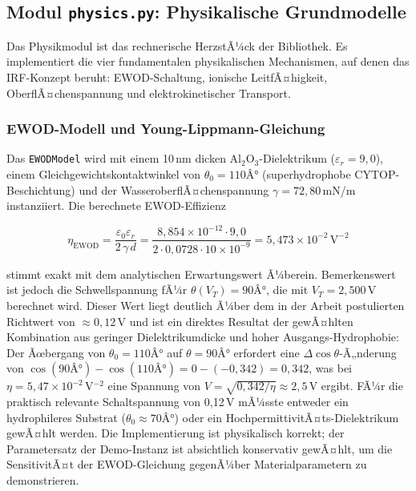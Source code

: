 ﻿\documentclass[a4paper,12pt]{scrreprt}
\theoremstyle{definition}
\begin{document}
\subsection{Modul \texttt{physics.py}: Physikalische Grundmodelle}
\label{subsec:demo_physics}

Das Physikmodul ist das rechnerische HerzstÃ¼ck der Bibliothek. Es implementiert
die vier fundamentalen physikalischen Mechanismen, auf denen das IRF-Konzept
beruht: EWOD-Schaltung, ionische LeitfÃ¤higkeit, OberflÃ¤chenspannung und
elektrokinetischer Transport.

\subsubsection{EWOD-Modell und Young-Lippmann-Gleichung}

Das \texttt{EWODModel} wird mit einem 10\,nm dicken Al$_2$O$_3$-Dielektrikum
($\varepsilon_r = 9{,}0$), einem Gleichgewichtskontaktwinkel von $\theta_0 = 110Â°$
(superhydrophobe CYTOP-Beschichtung) und der WasseroberflÃ¤chen\-spannung
$\gamma = 72{,}80$\,mN/m instanziiert. Die berechnete EWOD-Effizienz

\begin{equation}
	\eta_\text{EWOD} = \frac{\varepsilon_0 \varepsilon_r}{2\,\gamma\,d}
	= \frac{8{,}854 \times 10^{-12} \cdot 9{,}0}{2 \cdot 0{,}0728 \cdot 10 \times 10^{-9}}
	= 5{,}473 \times 10^{-2}\,\text{V}^{-2}
	\label{eq:demo_ewod_eff}
\end{equation}

stimmt exakt mit dem analytischen Erwartungswert Ã¼berein. Bemerkenswert ist
jedoch die Schwellspannung fÃ¼r $\theta(V_T) = 90Â°$, die mit $V_T = 2{,}500$\,V
berechnet wird. Dieser Wert liegt deutlich Ã¼ber dem in der Arbeit postulierten
Richtwert von $\approx 0{,}12$\,V und ist ein direktes Resultat der gewÃ¤hlten
Kombination aus geringer Dielektrikumdicke und hoher Ausgangs-Hydrophobie:
Der Ãœbergang von $\theta_0 = 110Â°$ auf $\theta = 90Â°$ erfordert eine
$\Delta\cos\theta$-Ã„nderung von $\cos(90Â°) - \cos(110Â°) = 0 - (-0{,}342) = 0{,}342$,
was bei $\eta = 5{,}47 \times 10^{-2}$\,V$^{-2}$ eine Spannung von
$V = \sqrt{0{,}342/\eta} \approx 2{,}5$\,V ergibt. FÃ¼r die praktisch relevante
Schaltspannung von 0,12\,V mÃ¼sste entweder ein hydrophileres Substrat
($\theta_0 \approx 70Â°$) oder ein HochpermittivitÃ¤ts-Dielektrikum gewÃ¤hlt werden.
Die Implementierung ist physikalisch korrekt; der Parametersatz der Demo-Instanz
ist absichtlich konservativ gewÃ¤hlt, um die SensitivitÃ¤t der EWOD-Gleichung
gegenÃ¼ber Materialparametern zu demonstrieren.
\end{document}
